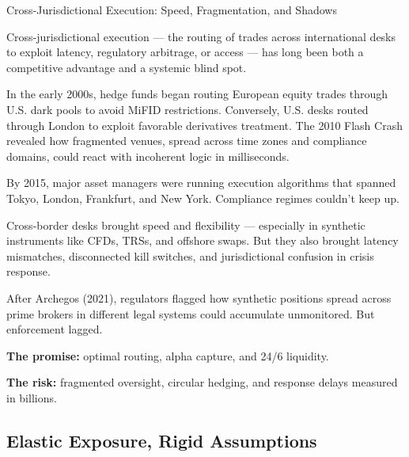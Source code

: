 \begin{HistoricalSidebar}{Cross-Jurisdictional Execution: Speed, Fragmentation, and Shadows}

  Cross-jurisdictional execution — the routing of trades across international desks to exploit 
  latency, regulatory 
  arbitrage, or access — has long been both a competitive advantage and a systemic blind spot.

  \medskip
  
  In the early 2000s, hedge funds began routing European equity trades through U.S. dark pools 
  to avoid MiFID 
  restrictions. Conversely, U.S. desks routed through London to exploit favorable derivatives 
  treatment. The 2010 
  Flash Crash revealed how fragmented venues, spread across time zones and compliance domains, 
  could react with 
  incoherent logic in milliseconds.

  \medskip
  
  By 2015, major asset managers were running execution algorithms that spanned Tokyo, London, 
  Frankfurt, and New 
  York. Compliance regimes couldn’t keep up.

  \medskip
  
  Cross-border desks brought speed and flexibility — especially in synthetic instruments like 
  CFDs, TRSs, and 
  offshore swaps. But they also brought latency mismatches, disconnected kill switches, and 
  jurisdictional confusion 
  in crisis response.

  \medskip
  
  After Archegos (2021), regulators flagged how synthetic positions spread across prime brokers in 
  different legal 
  systems could accumulate unmonitored. But enforcement lagged.

  \medskip
  
  \textbf{The promise:} optimal routing, alpha capture, and 24/6 liquidity.

  \medskip

  \textbf{The risk:} fragmented oversight, circular hedging, and response delays measured in billions.
  
\end{HistoricalSidebar}

\medskip



\subsection{Elastic Exposure, Rigid Assumptions}

